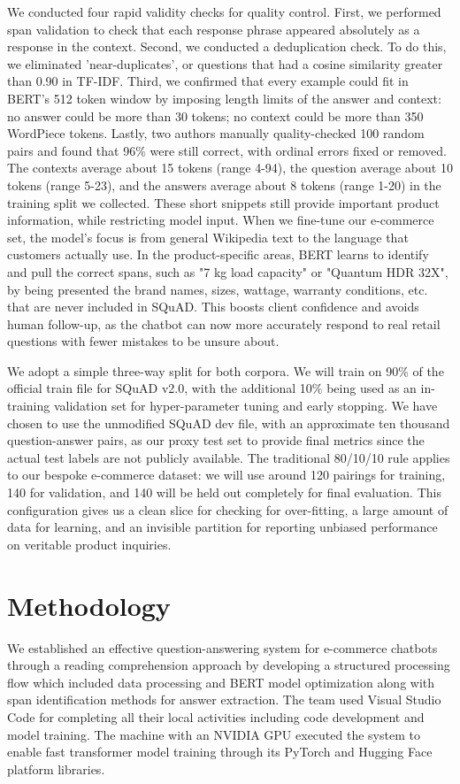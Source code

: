 \documentclass[10pt,conference]{IEEEtran}
\begin{document}
We conducted four rapid validity checks for quality control. First, we performed span validation to check that each response phrase appeared absolutely as a response in the context. Second, we conducted a deduplication check. To do this, we eliminated 'near-duplicates', or questions that had a cosine similarity greater than 0.90 in TF-IDF. Third, we confirmed that every example could fit in BERT's 512 token window by imposing length limits of the answer and context: no answer could be more than 30 tokens; no context could be more than 350 WordPiece tokens. Lastly, two authors manually quality-checked 100 random pairs and found that 96\% were still correct, with ordinal errors fixed or removed.
 The contexts average about 15 tokens (range 4-94), the question average about 10 tokens (range 5-23), and the answers average about 8 tokens (range 1-20) in the training split we collected. These short snippets still provide important product information, while restricting model input.
When we fine-tune our e-commerce set, the model's focus is from general Wikipedia text to the language that customers actually use. In the product-specific areas, BERT learns to identify and pull the correct spans, such as "7 kg load capacity" or "Quantum HDR 32X", by being presented the brand names, sizes, wattage, warranty conditions, etc. that are never included in SQuAD. This boosts client confidence and avoids human follow-up, as the chatbot can now more accurately respond to real retail questions with fewer mistakes to be unsure about.

We adopt a simple three-way split for both corpora. We will train on 90\% of the official train file for SQuAD v2.0, with the additional 10\% being used as an in-training validation set for hyper-parameter tuning and early stopping. We have chosen to use the unmodified SQuAD dev file, with an approximate ten thousand question-answer pairs, as our proxy test set to provide final metrics since the actual test labels are not publicly available. The traditional 80/10/10 rule applies to our bespoke e-commerce dataset: we will use around 120 pairings for training, 140 for validation, and 140 will be held out completely for final evaluation. This configuration gives us a clean slice for checking for over-fitting, a large amount of data for learning, and an invisible partition for reporting unbiased performance on veritable product inquiries.

\section{Methodology}
We established an effective question-answering system for e-commerce chatbots through a reading comprehension approach by developing a structured processing flow which included data processing and BERT model optimization along with span identification methods for answer extraction. The team used Visual Studio Code for completing all their local activities including code development and model training. The machine with an NVIDIA GPU executed the system to enable fast transformer model training through its PyTorch and Hugging Face platform libraries.\\
\end{document}
